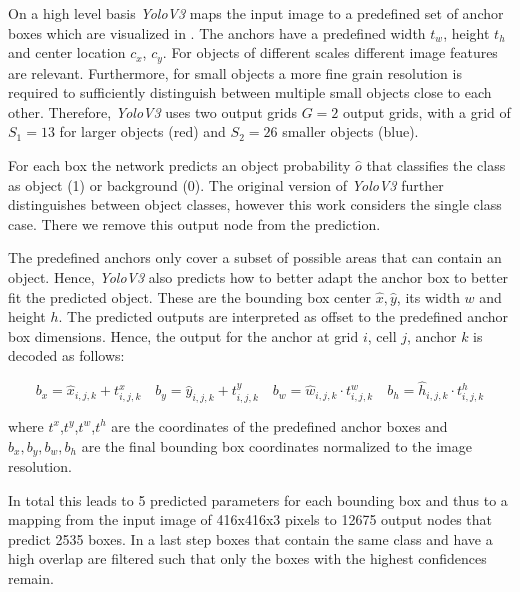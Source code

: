 	On a high level basis \textit{YoloV3} maps the input image to a predefined set of anchor boxes which are visualized in . The anchors have a predefined width $t_w$, height $t_h$ and center location $c_x$, $c_y$. For objects of different scales different image features are relevant. Furthermore, for small objects a more fine grain resolution is required to sufficiently distinguish between multiple small objects close to each other. Therefore, \textit{YoloV3} uses two output grids $G=2$ output grids, with a grid of $S_1 =13$ for larger objects (red) and $S_2 = 26$ smaller objects (blue). 
	
	For each box the network predicts an object probability $\hat o$ that classifies the class as object (1) or background (0). The original version of \textit{YoloV3} further distinguishes between object classes, however this work considers the single class case. There we remove this output node from the prediction. 
	
	The predefined anchors only cover a subset of possible areas that can contain an object. Hence, \textit{YoloV3} also predicts how to better adapt the anchor box to better fit the predicted object. These are the bounding box center $\hat x,\hat y$, its width $w$ and height $h$. The predicted outputs are interpreted as offset to the predefined anchor box dimensions. Hence, the output for the anchor at grid $i$, cell $j$, anchor $k$  is decoded as follows:
	
	\begin{equation}
	b_x = \hat x_{i,j,k} + t^x_{i,j,k}\quad
	b_y = \hat y_{i,j,k} + t^y_{i,j,k}\quad
	b_w = \hat w_{i,j,k} \cdot t^w_{i,j,k}\quad
	b_h = \hat h_{i,j,k} \cdot t^h_{i,j,k}
	\end{equation}
	
	where $t^x$,$t^y$,$t^w$,$t^h$ are the coordinates of the predefined anchor boxes and $b_x,b_y,b_w,b_h$ are the final bounding box coordinates normalized to the image resolution.
		
	In total this leads to 5 predicted parameters for each bounding box and thus to a mapping from the input image of 416x416x3 pixels to 12675 output nodes that predict 2535 boxes. In a last step boxes that contain the same class and have a high overlap are filtered such that only the boxes with the highest confidences remain.	
			
